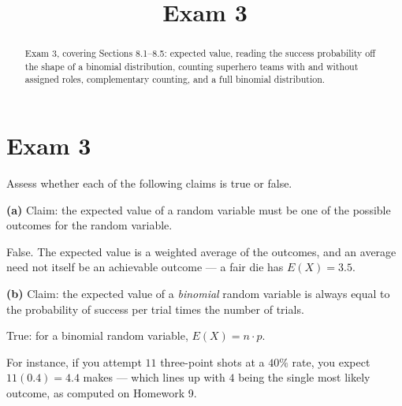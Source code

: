\documentclass[12pt]{ximera}
\title{Exam 3}
\begin{document}
\begin{abstract}
Exam 3, covering Sections 8.1--8.5: expected value, reading the success probability
off the shape of a binomial distribution, counting superhero teams with and without
assigned roles, complementary counting, and a full binomial distribution.
\end{abstract}
\maketitle

\section*{Exam 3}

\begin{problem}
Assess whether each of the following claims is true or false.

\begin{prompt}
\textbf{(a)} Claim: the expected value of a random variable must be one of the
possible outcomes for the random variable.

\begin{multipleChoice}
\end{multipleChoice}

\begin{feedback}
False. The expected value is a weighted average of the outcomes, and an average need
not itself be an achievable outcome --- a fair die has $E(X)=3.5$.
\end{feedback}
\end{prompt}

\begin{prompt}
\textbf{(b)} Claim: the expected value of a \emph{binomial} random variable is always
equal to the probability of success per trial times the number of trials.

\begin{multipleChoice}
\end{multipleChoice}

\begin{feedback}
True: for a binomial random variable, $E(X)=n\cdot p$.

For instance, if you attempt $11$ three-point shots at a $40\%$ rate, you expect
$11(0.4)=4.4$ makes --- which lines up with $4$ being the single most likely
outcome, as computed on Homework 9.
\end{feedback}
\end{prompt}
\end{problem}
\end{document}
